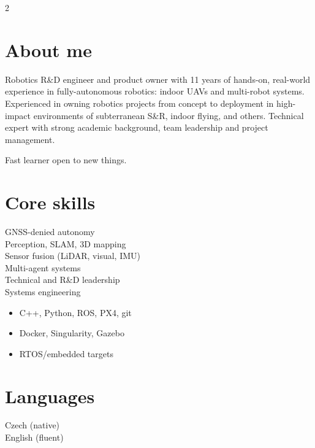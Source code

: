 \documentclass[12pt,a4paper]{article}
\newcommand{\whitesquare}{\raisebox{0.5ex}{\textcolor{white}{\rule{0.5ex}{0.5ex}}}}
\begin{document}
\begin{paracol}{2}
\vspace{0.6em}
\section*{About me}
Robotics R\&D engineer and product owner with 11 years of hands-on, real-world experience in fully-autonomous robotics: indoor UAVs and multi-robot systems.
Experienced in owning robotics projects from concept to deployment in high-impact environments of subterranean S\&R, indoor flying, and others.
  Technical expert with strong academic background, team leadership and project management.

\vspace{0.4em}
\noindent

\vspace{0.4em}
\noindent
Fast learner open to new things.

\vspace{0.6em}
\section*{Core skills}
GNSS-denied autonomy\\
Perception, SLAM, 3D mapping\\
Sensor fusion (LiDAR, visual, IMU)\\
Multi-agent systems\\
Technical and R\&D leadership\\
Systems engineering
\begin{itemize}[label=\whitesquare, left=1.0em]
  \item C++, Python, ROS, PX4, git
  \item Docker, Singularity, Gazebo
  \item RTOS/embedded targets
\end{itemize}

\vspace{0.4em}
\section*{Languages}
Czech (native)\\
English (fluent)

\switchcolumn

\color{primary}


\end{paracol}
\end{document}
